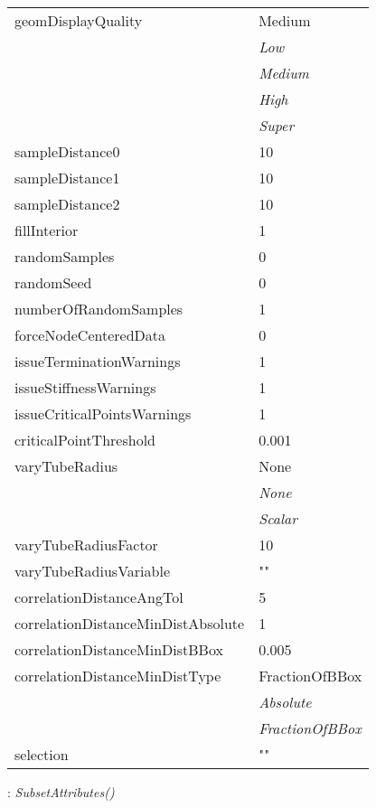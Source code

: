 \documentclass[10pt,a4paper]{report}
\begin{document}
\begin{longtable}{ll}
geomDisplayQuality  &  Medium   \\
 & {\it  Low} \\
 & {\it  Medium} \\
 & {\it  High} \\
 & {\it  Super} \\
sampleDistance0  &  10 \\
sampleDistance1  &  10 \\
sampleDistance2  &  10 \\
fillInterior  &  1 \\
randomSamples  &  0 \\
randomSeed  &  0 \\
numberOfRandomSamples  &  1 \\
forceNodeCenteredData  &  0 \\
issueTerminationWarnings  &  1 \\
issueStiffnessWarnings  &  1 \\
issueCriticalPointsWarnings  &  1 \\
criticalPointThreshold  &  0.001 \\
varyTubeRadius  &  None   \\
 & {\it  None} \\
 & {\it  Scalar} \\
varyTubeRadiusFactor  &  10 \\
varyTubeRadiusVariable  &  "" \\
correlationDistanceAngTol  &  5 \\
correlationDistanceMinDistAbsolute  &  1 \\
correlationDistanceMinDistBBox  &  0.005 \\
correlationDistanceMinDistType  &  FractionOfBBox   \\
 & {\it  Absolute} \\
 & {\it  FractionOfBBox} \\
selection  &  "" \\
\end{longtable}

\newpage

{}
: {\it SubsetAttributes() }\\[-3mm]
\end{document}
